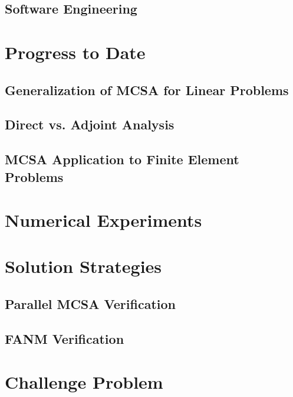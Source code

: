 \subsection{Software Engineering}
\label{subsec:software_engineering}

\section{Progress to Date}
\label{sec:progress}

\subsection{Generalization of MCSA for Linear Problems}
\label{subsec:mcsa_generalization}

\subsection{Direct vs. Adjoint Analysis}
\label{subsec:mcsa_direct_vs_adjoint}

\subsection{MCSA Application to Finite Element Problems}
\label{subsec:mcsa_finite_element}

\section{Numerical Experiments}
\label{sec:key_questions}

\section{Solution Strategies}
\label{sec:solution_strategies}

\subsection{Parallel MCSA Verification}
\label{subsubsec:mcsa_verification}

\subsection{FANM Verification}
\label{subsubsec:fanm_verification}

\section{Challenge Problem}
\label{sec:challenge_problem}
